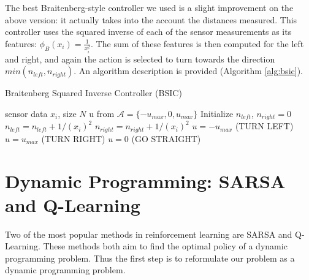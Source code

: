 \documentclass{article}
\begin{document}
The best Braitenberg-style controller we used is a slight improvement on the above version: it actually takes into the account the distances measured.  This controller uses the squared inverse of each of the sensor measurements as its features: $\phi_{B} (x_i) = \frac{1}{x_i^2}$.  The sum of these features is then computed for the left and right, and again the action is selected to turn towards the direction $min(n_{left}, n_{right})$.  An algorithm description is provided (Algorithm \ref{alg:bsic}).
%
\begin{algorithm}[]
   \caption{Braitenberg Squared Inverse Controller (BSIC)}
   \label{alg:bsic}
\begin{algorithmic}
    sensor data $x_i$, size $N$
    u from $\mathcal{A} =  \{-u_{max}, 0, u_{max}\}$
   \STATE Initialize $n_{left}$, $n_{right} = 0$
   \STATE $n_{left} = n_{left} + 1/(x_i)^2$
   \ENDFOR
   \STATE $n_{right} = n_{right} + 1/(x_i)^2$
   \ENDFOR
   \STATE $u = -u_{max}$ (TURN LEFT)
   \ELSE 
   \STATE $u = u_{max}$ (TURN RIGHT)
   \ELSE 
   \STATE $u=0$ (GO STRAIGHT)
   \ENDIF
   \ENDIF

\end{algorithmic}
\end{algorithm}



\section{Dynamic Programming: SARSA and Q-Learning}
Two of the most popular methods in reinforcement learning are SARSA and Q-Learning. These methods both aim to find the optimal policy of a dynamic programming problem. Thus the first step is to reformulate our problem as a dynamic programming problem. 
\end{document}
